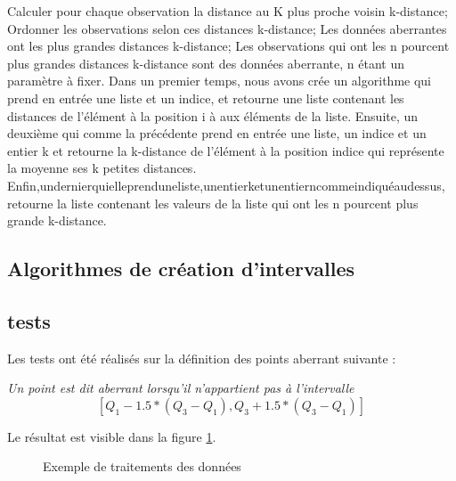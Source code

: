 \documentclass[a4paper,12pt]{article} %
\begin{document}
Calculer pour chaque observation la distance au K plus proche voisin k-distance; Ordonner les observations selon ces distances k-distance; Les données aberrantes ont les plus grandes distances k-distance; Les observations qui ont les n pourcent plus grandes distances k-distance sont des données aberrante, n étant un paramètre à ﬁxer. Dans un premier temps, nous avons crée un algorithme qui prend en entrée une liste et un indice, et retourne une liste contenant les distances de l’élément à la position i à aux éléments de la liste. Ensuite, un deuxième qui comme la précédente prend en entrée une liste, un indice et un entier k et retourne la k-distance de l’élément à la position indice qui représente la moyenne ses k petites distances. Enﬁn,undernierquielleprenduneliste,unentierketunentierncommeindiquéaudessus, retourne la liste contenant les valeurs de la liste qui ont les n pourcent plus grande k-distance.

\subsection{Algorithmes de création d'intervalles}

\subsection{tests}

Les tests ont été réalisés sur la définition des points aberrant suivante :

\emph{Un point est dit aberrant lorsqu'il n'appartient pas à l'intervalle }
\[[Q_1 - 1.5*(Q_3 - Q_1) , Q_3 +1.5*(Q_3 - Q_1)]\]

Le résultat est visible dans la figure \ref{suppr}.


\begin{figure}
\begin{center}
\end{center}
\caption{Exemple de traitements des données}
\label{suppr}
\end{figure}
\end{document}
